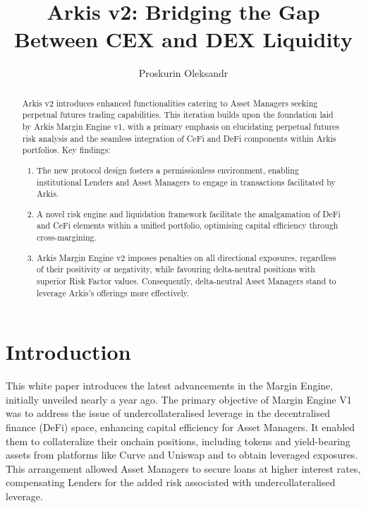 \documentclass[conference]{IEEEtran}
\begin{document}
 
\title{Arkis v2: Bridging the Gap Between CEX and DEX Liquidity}
\author{Proskurin Oleksandr}

\maketitle
    \begin{abstract}
Arkis v2 introduces enhanced functionalities catering to Asset Managers seeking perpetual futures trading capabilities. This iteration builds upon the foundation laid by Arkis Margin Engine v1, with a primary emphasis on elucidating perpetual futures risk analysis and the seamless integration of CeFi and DeFi components within Arkis portfolios.
Key findings: 
\begin{enumerate}
  \item The new protocol design fosters a permissionless environment, enabling institutional Lenders and Asset Managers to engage in transactions facilitated by Arkis.
  \item A novel risk engine and liquidation framework facilitate the amalgamation of DeFi and CeFi elements within a unified portfolio, optimising capital efficiency through cross-margining.
  \item Arkis Margin Engine v2 imposes penalties on all directional exposures, regardless of their positivity or negativity, while favouring delta-neutral positions with superior Risk Factor values. Consequently, delta-neutral Asset Managers stand to leverage Arkis's offerings more effectively.
  \end{enumerate}
\end{abstract}



\section{Introduction}

This white paper introduces the latest advancements in the Margin Engine, initially unveiled nearly a year ago. The primary objective of Margin Engine V1 was to address the issue of undercollateralised leverage in the decentralised finance (DeFi) space, enhancing capital efficiency for Asset Managers. It enabled them to collateralize their onchain positions, including tokens and yield-bearing assets from platforms like Curve and Uniswap and to obtain leveraged exposures. This arrangement allowed Asset Managers to secure loans at higher interest rates, compensating Lenders for the added risk associated with undercollateralised leverage.\cite{arkis-v1-whitepaper}
\end{document}
